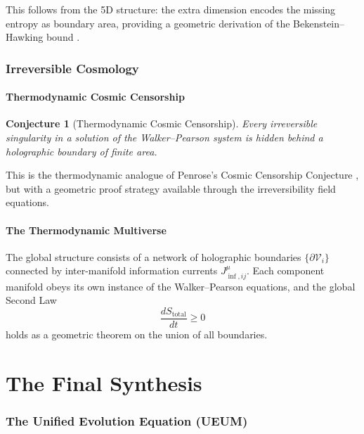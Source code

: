 \documentclass[12pt,a4paper]{article}
\newtheorem{conjecture}[theorem]{Conjecture}
\begin{document}
This follows from the 5D structure: the extra dimension encodes the missing
entropy as boundary area, providing a geometric derivation of the
Bekenstein--Hawking bound \citep{Bekenstein1973,Hawking1975}.

\section{Irreversible Cosmology}
\label{sec:cosmology}

\subsection{Thermodynamic Cosmic Censorship}

\begin{conjecture}[Thermodynamic Cosmic Censorship]
  Every irreversible singularity in a solution of the Walker--Pearson system
  is hidden behind a holographic boundary of finite area.
\end{conjecture}

This is the thermodynamic analogue of Penrose's Cosmic Censorship
Conjecture \citep{Penrose1969}, but with a geometric proof strategy available
through the irreversibility field equations.

\subsection{The Thermodynamic Multiverse}

The global structure consists of a network of holographic boundaries
$\{\partial\mathcal{V}_i\}$ connected by inter-manifold information currents
$J_{\inf,ij}^\mu$.  Each component manifold obeys its own instance of the
Walker--Pearson equations, and the global Second Law
\begin{equation}
  \frac{dS_{\text{total}}}{dt} \ge 0
  \label{eq:global-2nd-law}
\end{equation}
holds as a geometric theorem on the union of all boundaries.

\part{The Final Synthesis}

\section{The Unified Evolution Equation (UEUM)}
\label{sec:UEUM}
\end{document}
